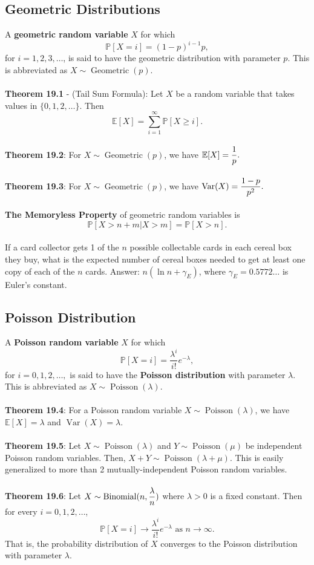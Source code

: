 \documentclass{article}
\theoremstyle{definition}
\DeclareMathOperator{\Geo}{Geometric}
\DeclareMathOperator{\Pois}{Poisson}
\DeclareMathOperator{\Binomial}{Binomial}
\DeclareMathOperator{\Var}{Var}
\begin{document}
\subsection*{Geometric Distributions}
A \textbf{geometric random variable} $X$ for which $$\mathbb{P}[X = i] = (1 - p)^{i - 1}p,$$ for $i = 1, 2, 3, \dots$, is said to have the geometric distribution with parameter $p$. This is abbreviated as $X \sim \Geo(p)$. \\ \\
\textbf{Theorem 19.1} - (Tail Sum Formula): Let $X$ be a random variable that takes values in $\{0, 1, 2, \dots\}$. Then $$\mathbb{E}[X] = \sum_{i = 1}^\infty \mathbb{P}[X \geq i].$$ \\
\textbf{Theorem 19.2}: For $X \sim \Geo(p)$, we have $\mathbb{E}[X] = \mathlarger{\frac{1}{p}}.$ \\ \\
\textbf{Theorem 19.3}:  For $X \sim \Geo(p)$, we have $\Var(X) = \mathlarger{\frac{1 - p}{p^2}}.$ \\ \\
\textbf{The Memoryless Property} of geometric random variables is $$\mathbb{P}[X > n + m | X > m] = \mathbb{P}[X > n].$$ \\
If a card collector gets 1 of the $n$ possible collectable cards in each cereal box they buy, what is the expected number of cereal boxes needed to get at least one copy of each of the $n$ cards. Answer:  $n(\ln{n} + \gamma_E)$, where $\gamma_E = 0.5772 \dots$ is Euler’s constant.
\subsection*{Poisson Distribution}
A \textbf{Poisson random variable} $X$ for which $$\mathbb{P}[X = i] = \frac{\lambda^i}{i!}e^{-\lambda},$$ for $i = 0, 1, 2, \dots,$ is said to have the \textbf{Poisson distribution} with parameter $\lambda$. This is abbreviated as $X \sim \Pois(\lambda)$. \\ \\
\textbf{Theorem 19.4}: For a Poisson random variable $X \sim \Pois(\lambda)$, we have $\mathbb{E}[X] = \lambda$ and $\Var(X) = \lambda$. \\ \\
\textbf{Theorem 19.5}: Let $X \sim \Pois(\lambda)$ and $Y \sim \Pois(\mu)$ be independent Poisson random variables. Then, $X + Y \sim \Pois(\lambda + \mu)$. This is easily generalized to more than 2 mutually-independent Poisson random variables. \\ \\
\textbf{Theorem 19.6}: Let $X \sim \Binomial(n, \mathlarger{\frac{\lambda}{n}})$ where $\lambda > 0$ is a fixed constant. Then for every $i = 0, 1, 2, \dots$, $$\mathbb{P}[X = i] \rightarrow \frac{\lambda^i}{i!}e^{-\lambda} \text{ as } n \rightarrow \infty.$$ That is, the probability distribution of $X$ converges to the Poisson distribution with parameter $\lambda$.
\end{document}
